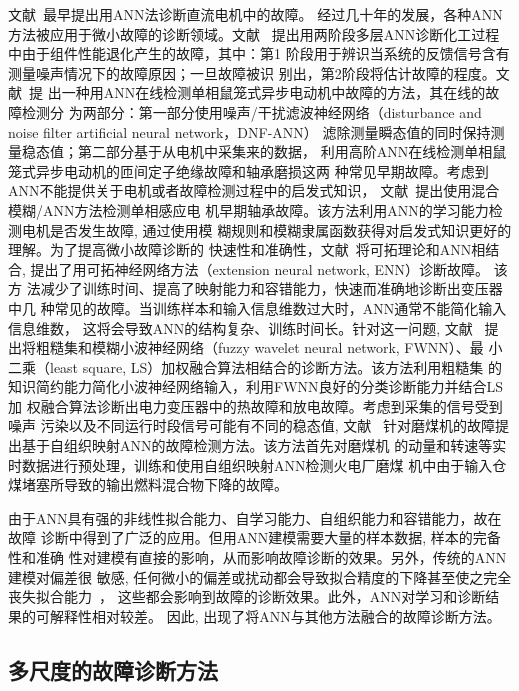 文献~最早提出用ANN法诊断直流电机中的故障。
经过几十年的发展，各种ANN方法被应用于微小故障的诊断领域。文献~
提出用两阶段多层ANN诊断化工过程中由于组件性能退化产生的故障，其中：第1
阶段用于辨识当系统的反馈信号含有测量噪声情况下的故障原因；一旦故障被识
别出，第2阶段将估计故障的程度。文献~提
出一种用ANN在线检测单相鼠笼式异步电动机中故障的方法，其在线的故障检测分
为两部分：第一部分使用噪声/干扰滤波神经网络（disturbance and noise filter artificial neural network，DNF-ANN）
滤除测量瞬态值的同时保持测量稳态值；第二部分基于从电机中采集来的数据，
利用高阶ANN在线检测单相鼠笼式异步电动机的匝间定子绝缘故障和轴承磨损这两
种常见早期故障。考虑到ANN不能提供关于电机或者故障检测过程中的启发式知识，
文献~提出使用混合模糊/ANN方法检测单相感应电
机早期轴承故障。该方法利用ANN的学习能力检测电机是否发生故障, 通过使用模
糊规则和模糊隶属函数获得对启发式知识更好的理解。为了提高微小故障诊断的
快速性和准确性，文献~将可拓理论和ANN相结合,
提出了用可拓神经网络方法（extension neural network, ENN）诊断故障。 该方
法减少了训练时间、提高了映射能力和容错能力，快速而准确地诊断出变压器中几
种常见的故障。当训练样本和输入信息维数过大时，ANN通常不能简化输入信息维数，
这将会导致ANN的结构复杂、训练时间长。针对这一问题, 文献~
提出将粗糙集和模糊小波神经网络（fuzzy wavelet neural network, FWNN）、最
小二乘（least square, LS）加权融合算法相结合的诊断方法。该方法利用粗糙集
的知识简约能力简化小波神经网络输入，利用FWNN良好的分类诊断能力并结合LS加
权融合算法诊断出电力变压器中的热故障和放电故障。考虑到采集的信号受到噪声
污染以及不同运行时段信号可能有不同的稳态值, 文献~
针对磨煤机的故障提出基于自组织映射ANN的故障检测方法。该方法首先对磨煤机
的动量和转速等实时数据进行预处理，训练和使用自组织映射ANN检测火电厂磨煤
机中由于输入仓煤堵塞所导致的输出燃料混合物下降的故障。

由于ANN具有强的非线性拟合能力、自学习能力、自组织能力和容错能力，故在故障
诊断中得到了广泛的应用。但用ANN建模需要大量的样本数据, 样本的完备性和准确
性对建模有直接的影响，从而影响故障诊断的效果。另外，传统的ANN建模对偏差很
敏感, 任何微小的偏差或扰动都会导致拟合精度的下降甚至使之完全丧失拟合能力~\cite{zhangzhengdao2004ann}，
这些都会影响到故障的诊断效果。此外，ANN对学习和诊断结果的可解释性相对较差。
因此, 出现了将ANN与其他方法融合的故障诊断方法。

\subsection{多尺度的故障诊断方法}

